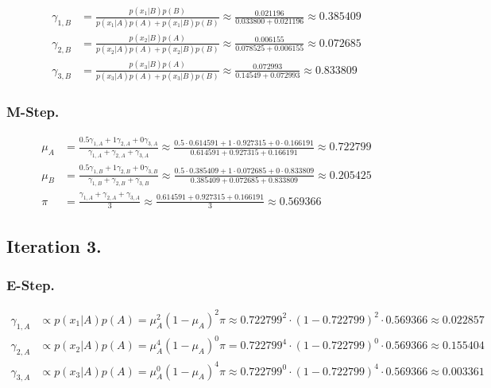 \documentclass[12pt]{article}
\begin{document}
	\begin{align*}
		\gamma_{1,B} &= \frac{p\left(x_1 \vert B\right) p\left(B\right)}
		{p\left(x_1 \vert A\right) p\left(A\right)
		+ p\left(x_1 \vert B\right) p\left(B\right)}
		\approx \frac{0.021196}{0.033800+0.021196} \approx 0.385409 \\
		\gamma_{2,B} &= \frac{p\left(x_2 \vert B\right) p\left(A\right)}
		{p\left(x_2 \vert A\right) p\left(A\right)
		+ p\left(x_2 \vert B\right) p\left(B\right)}
		\approx \frac{0.006155}{0.078525+0.006155} \approx 0.072685 \\
		\gamma_{3,B} &= \frac{p\left(x_3 \vert B\right) p\left(A\right)}
		{p\left(x_3 \vert A\right) p\left(A\right)
		+ p\left(x_3 \vert B\right) p\left(B\right)}
		\approx \frac{0.072993}{0.14549+0.072993} \approx 0.833809
	\end{align*}

	\subsubsection*{M-Step.}

	\begin{align*}
		\mu_A &= \frac{0.5\gamma_{1,A}+1\gamma_{2,A}+0\gamma_{3,A}}{\gamma_{1,A}+\gamma_{2,A}+\gamma_{3,A}}
		\approx \frac{0.5 \cdot 0.614591+1\cdot 0.927315+0\cdot 0.166191}{0.614591+0.927315+0.166191} \approx 0.722799 \\
		\mu_B &= \frac{0.5\gamma_{1,B}+1\gamma_{2,B}+0\gamma_{3,B}}{\gamma_{1,B}+\gamma_{2,B}+\gamma_{3,B}}
		\approx \frac{0.5 \cdot 0.385409 + 1 \cdot 0.072685 + 0 \cdot 0.833809}{0.385409 + 0.072685 + 0.833809} \approx 0.205425 \\
		\pi &= \frac{\gamma_{1,A}+\gamma_{2,A}+\gamma_{3,A}}{3}\approx\frac{0.614591+0.927315+0.166191}{3}\approx 0.569366
	\end{align*}

	\subsection*{Iteration 3.}

	\subsubsection*{E-Step.}

	\begin{align*}
		\gamma_{1,A} &\propto p\left(x_1 \vert A\right) p\left(A\right)
		= \mu_A^2 \left(1-\mu_A \right)^2 \pi
		\approx 0.722799^2 \cdot \left(1-0.722799\right)^2 \cdot 0.569366
		\approx 0.022857 \\
		\gamma_{2,A} &\propto p\left(x_2 \vert A\right) p\left(A\right)
		= \mu_A^4 \left(1-\mu_A\right)^0 \pi
		= 0.722799^4 \cdot \left(1-0.722799\right)^0 \cdot 0.569366
		\approx 0.155404 \\
		\gamma_{3,A} &\propto p\left(x_3 \vert A\right) p\left(A\right)
		= \mu_A^0 \left(1-\mu_A\right)^4 \pi
		\approx 0.722799^0 \cdot \left(1-0.722799\right)^4 \cdot 0.569366
		\approx 0.003361
	\end{align*}
\end{document}
